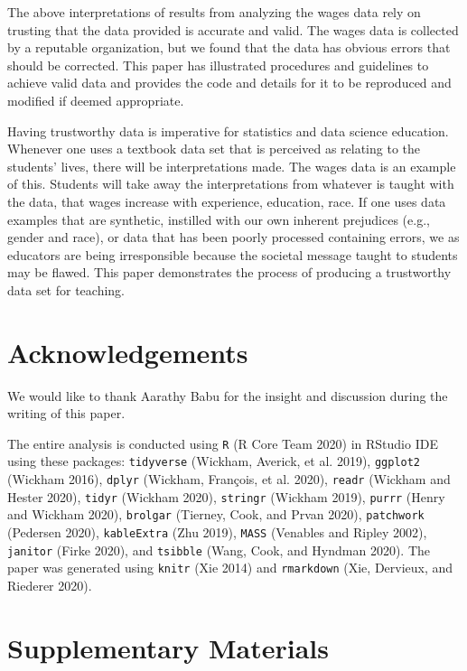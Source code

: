 \documentclass[12pt]{article}
\begin{document}
The above interpretations of results from analyzing the wages data rely on trusting that the data provided is accurate and valid. The wages data is collected by a reputable organization, but we found that the data has obvious errors that should be corrected. This paper has illustrated procedures and guidelines to achieve valid data and provides the code and details for it to be reproduced and modified if deemed appropriate.

Having trustworthy data is imperative for statistics and data science education. Whenever one uses a textbook data set that is perceived as relating to the students' lives, there will be interpretations made. The wages data is an example of this. Students will take away the interpretations from whatever is taught with the data, that wages increase with experience, education, race. If one uses data examples that are synthetic, instilled with our own inherent prejudices (e.g., gender and race), or data that has been poorly processed containing errors, we as educators are being irresponsible because the societal message taught to students may be flawed. This paper demonstrates the process of producing a trustworthy data set for teaching.

\hypertarget{acknowledgements}{%
\section{Acknowledgements}\label{acknowledgements}}

We would like to thank Aarathy Babu for the insight and discussion during the writing of this paper.

The entire analysis is conducted using \texttt{R} (R Core Team 2020) in RStudio IDE using these packages: \texttt{tidyverse} (Wickham, Averick, et al. 2019), \texttt{ggplot2} (Wickham 2016), \texttt{dplyr} (Wickham, François, et al. 2020), \texttt{readr} (Wickham and Hester 2020), \texttt{tidyr} (Wickham 2020), \texttt{stringr} (Wickham 2019), \texttt{purrr} (Henry and Wickham 2020), \texttt{brolgar} (Tierney, Cook, and Prvan 2020), \texttt{patchwork} (Pedersen 2020), \texttt{kableExtra} (Zhu 2019), \texttt{MASS} (Venables and Ripley 2002), \texttt{janitor} (Firke 2020), and \texttt{tsibble} (Wang, Cook, and Hyndman 2020). The paper was generated using \texttt{knitr} (Xie 2014) and \texttt{rmarkdown} (Xie, Dervieux, and Riederer 2020).

\hypertarget{supplementary-materials}{%
\section{Supplementary Materials}\label{supplementary-materials}}
\end{document}
